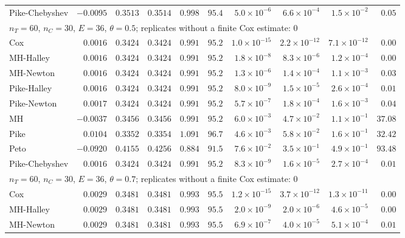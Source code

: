 \begin{landscape}
\begin{longtable}{lrrrrrrrrr}
Pike-Chebyshev & $-0.0095$ & $0.3513$ & $0.3514$ & $0.998$ & $95.4$ & $5.0 \times 10^{-6}$ & $6.6 \times 10^{-4}$ & $1.5 \times 10^{-2}$ & $0.05$ \\
\multicolumn{10}{l}{$n_T = 60$, $n_C = 30$, $E = 36$, $\theta = 0.5$; replicates without a finite Cox estimate: 0} \\
Cox & $0.0016$ & $0.3424$ & $0.3424$ & $0.991$ & $95.2$ & $1.0 \times 10^{-15}$ & $2.2 \times 10^{-12}$ & $7.1 \times 10^{-12}$ & $0.00$ \\
MH-Halley & $0.0016$ & $0.3424$ & $0.3424$ & $0.991$ & $95.2$ & $1.8 \times 10^{-8}$ & $8.3 \times 10^{-6}$ & $1.2 \times 10^{-4}$ & $0.00$ \\
MH-Newton & $0.0016$ & $0.3424$ & $0.3424$ & $0.991$ & $95.2$ & $1.3 \times 10^{-6}$ & $1.4 \times 10^{-4}$ & $1.1 \times 10^{-3}$ & $0.03$ \\
Pike-Halley & $0.0016$ & $0.3424$ & $0.3424$ & $0.991$ & $95.2$ & $8.0 \times 10^{-9}$ & $1.5 \times 10^{-5}$ & $2.6 \times 10^{-4}$ & $0.01$ \\
Pike-Newton & $0.0017$ & $0.3424$ & $0.3424$ & $0.991$ & $95.2$ & $5.7 \times 10^{-7}$ & $1.8 \times 10^{-4}$ & $1.6 \times 10^{-3}$ & $0.04$ \\
MH & $-0.0037$ & $0.3456$ & $0.3456$ & $0.991$ & $95.2$ & $6.0 \times 10^{-3}$ & $4.7 \times 10^{-2}$ & $1.1 \times 10^{-1}$ & $37.08$ \\
Pike & $0.0104$ & $0.3352$ & $0.3354$ & $1.091$ & $96.7$ & $4.6 \times 10^{-3}$ & $5.8 \times 10^{-2}$ & $1.6 \times 10^{-1}$ & $32.42$ \\
Peto & $-0.0920$ & $0.4155$ & $0.4256$ & $0.884$ & $91.5$ & $7.6 \times 10^{-2}$ & $3.5 \times 10^{-1}$ & $4.9 \times 10^{-1}$ & $93.48$ \\
Pike-Chebyshev & $0.0016$ & $0.3424$ & $0.3424$ & $0.991$ & $95.2$ & $8.3 \times 10^{-9}$ & $1.6 \times 10^{-5}$ & $2.7 \times 10^{-4}$ & $0.01$ \\
\multicolumn{10}{l}{$n_T = 60$, $n_C = 30$, $E = 36$, $\theta = 0.7$; replicates without a finite Cox estimate: 0} \\
Cox & $0.0029$ & $0.3481$ & $0.3481$ & $0.993$ & $95.5$ & $1.2 \times 10^{-15}$ & $3.7 \times 10^{-12}$ & $1.3 \times 10^{-11}$ & $0.00$ \\
MH-Halley & $0.0029$ & $0.3481$ & $0.3481$ & $0.993$ & $95.5$ & $2.0 \times 10^{-9}$ & $2.0 \times 10^{-6}$ & $4.6 \times 10^{-5}$ & $0.00$ \\
MH-Newton & $0.0029$ & $0.3481$ & $0.3481$ & $0.993$ & $95.5$ & $6.9 \times 10^{-7}$ & $4.0 \times 10^{-5}$ & $5.1 \times 10^{-4}$ & $0.01$ \\

\end{longtable}
\end{landscape}
